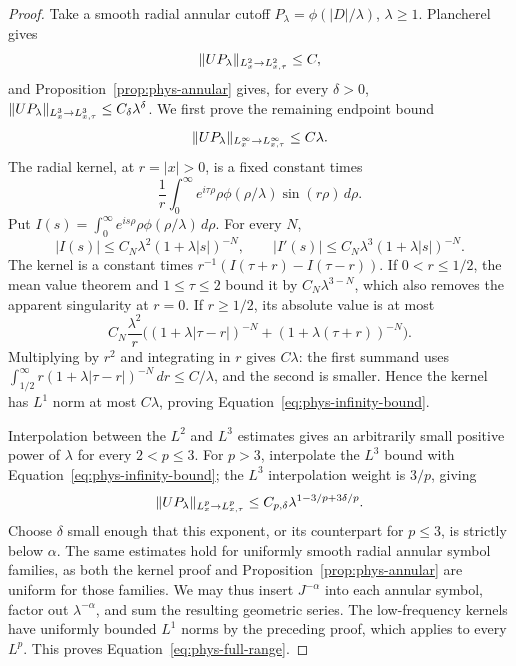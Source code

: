 \begin{proof}
Take a smooth radial annular cutoff
$P_\lambda=\phi(|D|/\lambda)$, $\lambda\ge1$.  Plancherel gives
\[
 \lVert UP_\lambda\rVert_{L^2_x\to L^2_{x,\tau}}\le C,
\]
and Proposition~\ref{prop:phys-annular} gives, for every $\delta>0$,
$\lVert UP_\lambda\rVert_{L^3_x\to L^3_{x,\tau}}\le C_\delta\lambda^\delta$.
We first prove the remaining endpoint bound
\begin{equation}
 \lVert UP_\lambda\rVert_{L^\infty_x\to L^\infty_{x,\tau}}
 \le C\lambda.
 \label{eq:phys-infinity-bound}
\end{equation}
The radial kernel, at $r=|x|>0$, is a fixed constant times
\[
 \frac1r\int_0^\infty e^{i\tau\rho}
             \rho\phi(\rho/\lambda)\sin(r\rho)\,d\rho.
\]
Put $I(s)=\int_0^\infty e^{is\rho}\rho\phi(\rho/\lambda)\,d\rho$.
For every $N$,
\[
 |I(s)|\le C_N\lambda^2(1+\lambda|s|)^{-N},\qquad
 |I'(s)|\le C_N\lambda^3(1+\lambda|s|)^{-N}.
\]
The kernel is a constant times
$r^{-1}(I(\tau+r)-I(\tau-r))$.  If $0<r\le1/2$, the mean value
theorem and $1\le\tau\le2$ bound it by $C_N\lambda^{3-N}$,
which also removes the apparent singularity at $r=0$.  If
$r\ge1/2$, its absolute value is at most
\[
 C_N\frac{\lambda^2}{r}
 \big((1+\lambda|\tau-r|)^{-N}
                +(1+\lambda(\tau+r))^{-N}\big).
\]
Multiplying by $r^2$ and integrating in $r$ gives $C\lambda$:
the first summand uses
$\int_{1/2}^\infty r(1+\lambda|\tau-r|)^{-N}\,dr\le C/\lambda$,
and the second is smaller.  Hence the kernel has $L^1$ norm at
most $C\lambda$, proving Equation~\eqref{eq:phys-infinity-bound}.

Interpolation between the $L^2$ and $L^3$ estimates gives an
arbitrarily small positive power of $\lambda$ for every $2<p\le3$.
For $p>3$, interpolate the $L^3$ bound with
Equation~\eqref{eq:phys-infinity-bound}; the $L^3$ interpolation
weight is $3/p$, giving
\[
 \lVert UP_\lambda\rVert_{L^p_x\to L^p_{x,\tau}}
 \le C_{p,\delta}\lambda^{1-3/p+3\delta/p}.
\]
Choose $\delta$ small enough that this exponent, or its counterpart
for $p\le3$, is strictly below $\alpha$.  The same estimates hold
for uniformly smooth radial annular symbol families, as both the
kernel proof and Proposition~\ref{prop:phys-annular} are uniform
for those families.  We may thus insert $J^{-\alpha}$ into each
annular symbol, factor out $\lambda^{-\alpha}$, and sum the
resulting geometric series.  The low-frequency kernels have
uniformly bounded $L^1$ norms by the preceding proof, which applies
to every $L^p$.  This proves Equation~\eqref{eq:phys-full-range}.
\end{proof}

